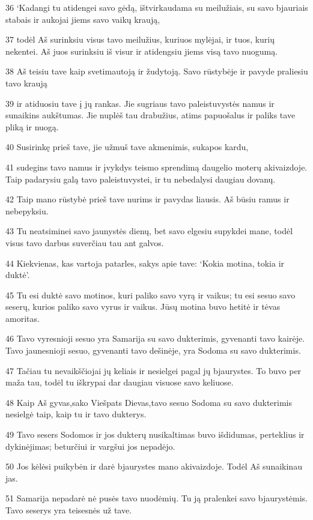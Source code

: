 \par 36 ‘Kadangi tu atidengei savo gėdą, ištvirkaudama su meilužiais, su savo bjauriais stabais ir aukojai jiems savo vaikų kraują, 
\par 37 todėl Aš surinksiu visus tavo meilužius, kuriuos mylėjai, ir tuos, kurių nekentei. Aš juos surinksiu iš visur ir atidengsiu jiems visą tavo nuogumą. 
\par 38 Aš teisiu tave kaip svetimautoją ir žudytoją. Savo rūstybėje ir pavyde praliesiu tavo kraują 
\par 39 ir atiduosiu tave į jų rankas. Jie sugriaus tavo paleistuvystės namus ir sunaikins aukštumas. Jie nuplėš tau drabužius, atims papuošalus ir paliks tave pliką ir nuogą. 
\par 40 Susirinkę prieš tave, jie užmuš tave akmenimis, sukapos kardu, 
\par 41 sudegins tavo namus ir įvykdys teismo sprendimą daugelio moterų akivaizdoje. Taip padarysiu galą tavo paleistuvystei, ir tu nebedalysi daugiau dovanų. 
\par 42 Taip mano rūstybė prieš tave nurims ir pavydas liausis. Aš būsiu ramus ir nebepyksiu. 
\par 43 Tu neatsiminei savo jaunystės dienų, bet savo elgesiu supykdei mane, todėl visus tavo darbus suverčiau tau ant galvos. 
\par 44 Kiekvienas, kas vartoja patarles, sakys apie tave: ‘Kokia motina, tokia ir duktė’. 
\par 45 Tu esi duktė savo motinos, kuri paliko savo vyrą ir vaikus; tu esi sesuo savo seserų, kurios paliko savo vyrus ir vaikus. Jūsų motina buvo hetitė ir tėvas amoritas. 
\par 46 Tavo vyresnioji sesuo yra Samarija su savo dukterimis, gyvenanti tavo kairėje. Tavo jaunesnioji sesuo, gyvenanti tavo dešinėje, yra Sodoma su savo dukterimis. 
\par 47 Tačiau tu nevaikščiojai jų keliais ir nesielgei pagal jų bjaurystes. To buvo per maža tau, todėl tu iškrypai dar daugiau visuose savo keliuose. 
\par 48 Kaip Aš gyvas,­sako Viešpats Dievas,­tavo sesuo Sodoma su savo dukterimis nesielgė taip, kaip tu ir tavo dukterys. 
\par 49 Tavo sesers Sodomos ir jos dukterų nusikaltimas buvo išdidumas, perteklius ir dykinėjimas; beturčiui ir vargšui jos nepadėjo. 
\par 50 Jos kėlėsi puikybėn ir darė bjaurystes mano akivaizdoje. Todėl Aš sunaikinau jas. 
\par 51 Samarija nepadarė nė pusės tavo nuodėmių. Tu ją pralenkei savo bjaurystėmis. Tavo seserys yra teisesnės už tave. 
